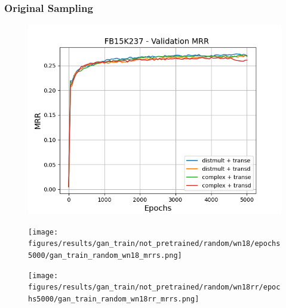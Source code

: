 \subsubsection{Original Sampling}


\begin{figure}
    \centering
    \begin{minipage}{.3\textwidth}
      \centering
      \includegraphics[width=\linewidth]{figures/results/gan_train/not_pretrained/random/fb15k237/epochs5000/gan_train_random_fb15k237_mrrs.png}
    \end{minipage}%
    \begin{minipage}{.3\textwidth}
      \centering
      \texttt{[image: figures/results/gan\_train/not\_pretrained/random/wn18/epochs5000/gan\_train\_random\_wn18\_mrrs.png]}
    \end{minipage}
    \begin{minipage}{.3\textwidth}
      \centering
      \texttt{[image: figures/results/gan\_train/not\_pretrained/random/wn18rr/epochs5000/gan\_train\_random\_wn18rr\_mrrs.png]}
    \end{minipage}%
    

\end{figure}
